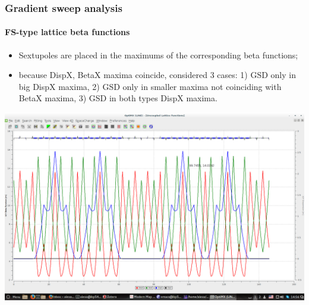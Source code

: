 \documentclass[pdf]{beamer}
\begin{document}
	\begin{frame}
		\frametitle{Gradient sweep analysis}
		\framesubtitle{FS-type lattice beta functions}
		\begin{itemize}
			\item Sextupoles are placed in the maximums of the corresponding beta functions;
			\item because DispX, BetaX maxima coincide, considered 3 cases: 1) GSD only in big DispX maxima, 2) GSD only in smaller maxima not coinciding with BetaX maxima, 3) GSD in both types DispX maxima.
		\end{itemize}
		\centering
		\includegraphics[scale=.12]{FS_BNL_optim}
	\end{frame}
\end{document}
